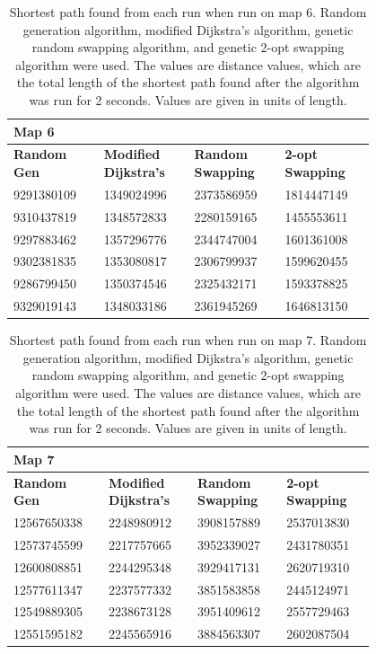 \documentclass{article}
\begin{document}
\begin{appendices}
\begin{table}[H]
    \caption{Shortest path found from each run when run on map 6. Random generation algorithm, modified Dijkstra's algorithm, genetic random swapping algorithm, and genetic 2-opt swapping algorithm were used. The values are distance values, which are the total length of the shortest path found after the algorithm was run for 2 seconds. Values are given in units of length.}
    \centering
    \begin{tabular}{|p{0.2\linewidth}|p{0.2\linewidth}|p{0.2\linewidth}|p{0.2\linewidth}|}
    \hline
        \textbf{Map 6} & ~ & ~ & ~ \\ \hline
        \textbf{Random Gen} & \textbf{Modified Dijkstra's} & \textbf{Random Swapping} & \textbf{2-opt Swapping} \\ \hline
        9291380109 & 1349024996 & 2373586959 & 1814447149 \\ \hline
        9310437819 & 1348572833 & 2280159165 & 1455553611 \\ \hline
        9297883462 & 1357296776 & 2344747004 & 1601361008 \\ \hline
        9302381835 & 1353080817 & 2306799937 & 1599620455 \\ \hline
        9286799450 & 1350374546 & 2325432171 & 1593378825 \\ \hline
        9329019143 & 1348033186 & 2361945269 & 1646813150 \\ \hline
    \end{tabular}
\end{table}

\begin{table}[H]
    \caption{Shortest path found from each run when run on map 7. Random generation algorithm, modified Dijkstra's algorithm, genetic random swapping algorithm, and genetic 2-opt swapping algorithm were used. The values are distance values, which are the total length of the shortest path found after the algorithm was run for 2 seconds. Values are given in units of length.}
    \centering
    \begin{tabular}{|p{0.2\linewidth}|p{0.2\linewidth}|p{0.2\linewidth}|p{0.2\linewidth}|}
    \hline
        \textbf{Map 7} & ~ & ~ & ~ \\ \hline
        \textbf{Random Gen} & \textbf{Modified Dijkstra's} & \textbf{Random Swapping} & \textbf{2-opt Swapping} \\ \hline
        12567650338 & 2248980912 & 3908157889 & 2537013830 \\ \hline
        12573745599 & 2217757665 & 3952339027 & 2431780351 \\ \hline
        12600808851 & 2244295348 & 3929417131 & 2620719310 \\ \hline
        12577611347 & 2237577332 & 3851583858 & 2445124971 \\ \hline
        12549889305 & 2238673128 & 3951409612 & 2557729463 \\ \hline
        12551595182 & 2245565916 & 3884563307 & 2602087504 \\ \hline
    \end{tabular}
\end{table}


\end{appendices}
\end{document}
